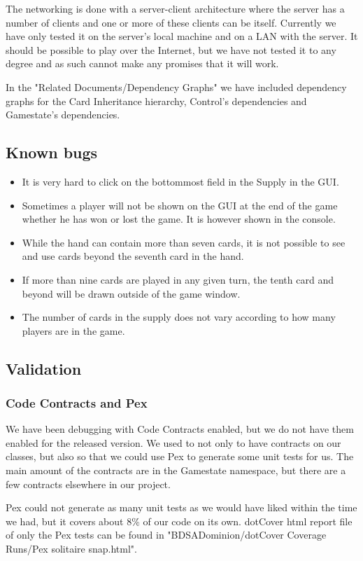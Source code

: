 \documentclass[12pt,a4paper,notitlepage]{article}
\begin{document}
The networking is done with a server-client architecture where the server has a number of clients and one or more of these clients can be itself. Currently we have only tested it on the server's local machine and on a LAN with the server. It should be possible to play over the Internet, but we have not tested it to any degree and as such cannot make any promises that it will work.

In the "Related Documents/Dependency Graphs" we have included dependency graphs for the Card Inheritance hierarchy, Control's dependencies and Gamestate's dependencies.

\subsection{Known bugs}
\begin{itemize}
\item It is very hard to click on the bottommost field in the Supply in the GUI.
\item Sometimes a player will not be shown on the GUI at the end of the game whether he has won or lost the game. It is however shown in the console.
\item While the hand can contain more than seven cards, it is not possible to see and use cards beyond the seventh card in the hand.
\item If more than nine cards are played in any given turn, the tenth card and beyond will be drawn outside of the game window.
\item The number of cards in the supply does not vary according to how many players are in the game.
\end{itemize}

\subsection{Validation}
\subsubsection{Code Contracts and Pex}
We have been debugging with Code Contracts enabled, but we do not have them enabled for the released version. We used to not only to have contracts on our classes, but also so that we could use Pex to generate some unit tests for us. The main amount of the contracts are in the Gamestate namespace, but there are a few contracts elsewhere in our project.

Pex could not generate as many unit tests as we would have liked within the time we had, but it covers about 8\% of our code on its own. dotCover html report file of only the Pex tests can be found in "BDSADominion/dotCover Coverage Runs/Pex solitaire snap.html".
\end{document}
